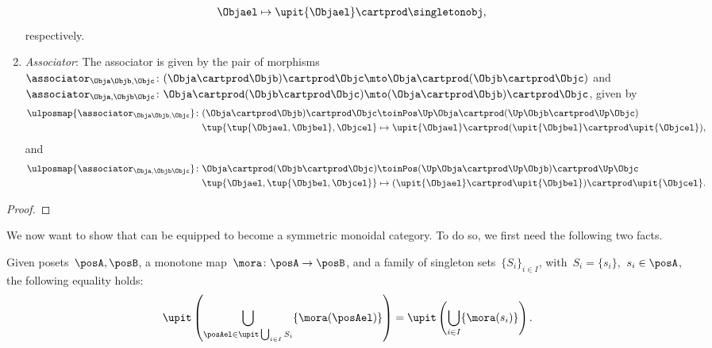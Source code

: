 \begin{lemma}
\begin{enumerate}
\begin{equation}
\begin{aligned}
				      \Objael                                          & \mapsto \upit \{\Objael\} \cartprod \singletonobj,
			      \end{aligned}
		      \end{equation}
		      respectively.
		\item \emph{Associator}: The associator is given by the pair of morphisms~$\associator_{\Obja\Objb,\Objc}\colon (\Obja\cartprod \Objb)\cartprod \Objc \mto \Obja\cartprod ( \Objb \cartprod \Objc)$ and~$\associator_{\Obja,\Objb\Objc}\colon \Obja\cartprod (\Objb\cartprod \Objc) \mto (\Obja\cartprod \Objb) \cartprod \Objc$, given by
		      \begin{equation}
			      \begin{aligned}
				      \ulposmap{\associator_{\Obja\Objb,\Objc}}\colon (\Obja\cartprod \Objb)\cartprod \Objc & \toinPos \Up \Obja\cartprod (\Up \Objb \cartprod \Up \Objc)                     \\
				      \tup{\tup{\Objael,\Objbel},\Objcel}                                                   & \mapsto \upit\{\Objael\}\cartprod (\upit\{\Objbel\}\cartprod \upit\{\Objcel\}),
			      \end{aligned}
		      \end{equation}
		      and
		      \begin{equation}
			      \begin{aligned}
				      \ulposmap{\associator_{\Obja,\Objb\Objc}}\colon \Obja\cartprod (\Objb\cartprod \Objc) & \toinPos (\Up \Obja\cartprod \Up \Objb) \cartprod \Up \Objc                     \\
				      \tup{\Objael,\tup{\Objbel,\Objcel}}                                                   & \mapsto (\upit\{\Objael\}\cartprod \upit\{\Objbel\})\cartprod \upit\{\Objcel\}.
			      \end{aligned}
		      \end{equation}
	\end{enumerate}
\end{lemma}
\begin{proof}
\end{proof}

We now want to show that \UPos can be equipped to become a symmetric monoidal category.
To do so, we first need the following two facts.

\begin{lemma}
	\label{lem:unpack_u_functor}
	Given posets~$\posA,\posB$, a monotone map~$\mora \colon \posA \to \posB$, and a family of singleton sets~$\{S_i\}_{i\in I}$, with~$S_i=\{s_i\}$,~$s_i\in \posA$, the following equality holds:
	\begin{equation}
		\label{eq:lemma_unpack}
		\upit \left( \bigcup_{\posAel \in \upit \bigcup_{i\in I}S_i}\{\mora(\posAel)\}\right)= \upit \left( \bigcup_{i\in I} \{\mora(s_i)\}\right).
	\end{equation}
\end{lemma}

